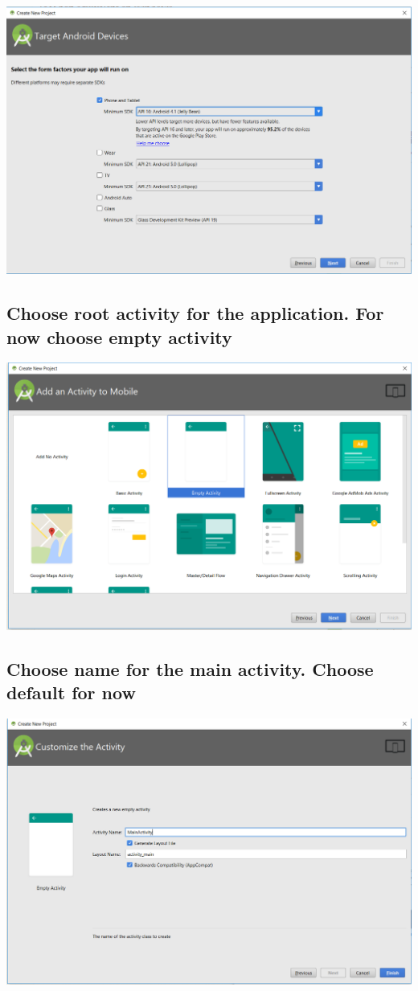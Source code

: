 \documentclass{article}
\begin{document}
\includegraphics[width=\textwidth]{lab1-2}

\subsection{Choose root activity for the application. For now choose empty activity}

\includegraphics[width=\textwidth]{lab1-3}

\subsection{Choose name for the main activity. Choose default for now}

\includegraphics[width=\textwidth]{lab1-4}
\end{document}
